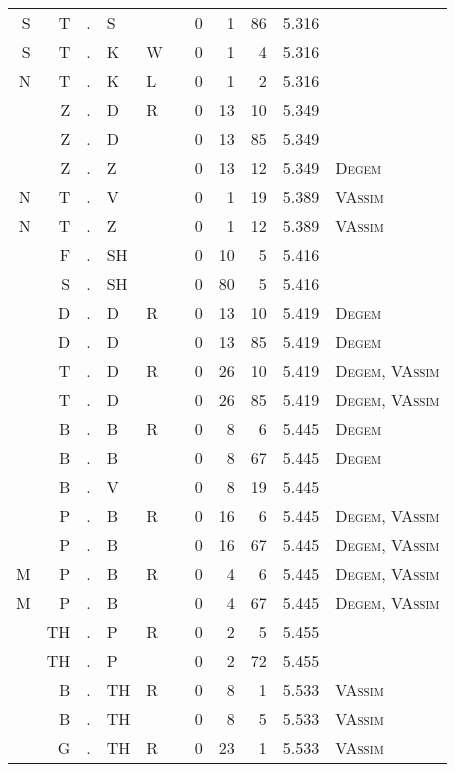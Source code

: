 \begin{longtable}{r@{ } r@{ } c@{ } l@{ } l@{ } l@{ } r r r r l }
S & T & . & S &   &   & 0 & 1 & 86 & 5.316 &  \\
S & T & . & K & W &   & 0 & 1 & 4 & 5.316 &  \\
N & T & . & K & L &   & 0 & 1 & 2 & 5.316 &  \\
  & Z & . & D & R &   & 0 & 13 & 10 & 5.349 &  \\
  & Z & . & D &   &   & 0 & 13 & 85 & 5.349 &  \\
  & Z & . & Z &   &   & 0 & 13 & 12 & 5.349 & \textsc{Degem} \\
N & T & . & V &   &   & 0 & 1 & 19 & 5.389 & \textsc{VAssim} \\
N & T & . & Z &   &   & 0 & 1 & 12 & 5.389 & \textsc{VAssim} \\
  & F & . & SH &   &   & 0 & 10 & 5 & 5.416 &  \\
  & S & . & SH &   &   & 0 & 80 & 5 & 5.416 &  \\
  & D & . & D & R &   & 0 & 13 & 10 & 5.419 & \textsc{Degem} \\
  & D & . & D &   &   & 0 & 13 & 85 & 5.419 & \textsc{Degem} \\
  & T & . & D & R &   & 0 & 26 & 10 & 5.419 & \textsc{Degem}, \textsc{VAssim} \\
  & T & . & D &   &   & 0 & 26 & 85 & 5.419 & \textsc{Degem}, \textsc{VAssim} \\
  & B & . & B & R &   & 0 & 8 & 6 & 5.445 & \textsc{Degem} \\
  & B & . & B &   &   & 0 & 8 & 67 & 5.445 & \textsc{Degem} \\
  & B & . & V &   &   & 0 & 8 & 19 & 5.445 &  \\
  & P & . & B & R &   & 0 & 16 & 6 & 5.445 & \textsc{Degem}, \textsc{VAssim} \\
  & P & . & B &   &   & 0 & 16 & 67 & 5.445 & \textsc{Degem}, \textsc{VAssim} \\
M & P & . & B & R &   & 0 & 4 & 6 & 5.445 & \textsc{Degem}, \textsc{VAssim} \\
M & P & . & B &   &   & 0 & 4 & 67 & 5.445 & \textsc{Degem}, \textsc{VAssim} \\
  & TH & . & P & R &   & 0 & 2 & 5 & 5.455 &  \\
  & TH & . & P &   &   & 0 & 2 & 72 & 5.455 &  \\
  & B & . & TH & R &   & 0 & 8 & 1 & 5.533 & \textsc{VAssim} \\
  & B & . & TH &   &   & 0 & 8 & 5 & 5.533 & \textsc{VAssim} \\
  & G & . & TH & R &   & 0 & 23 & 1 & 5.533 & \textsc{VAssim} \\

\end{longtable}
